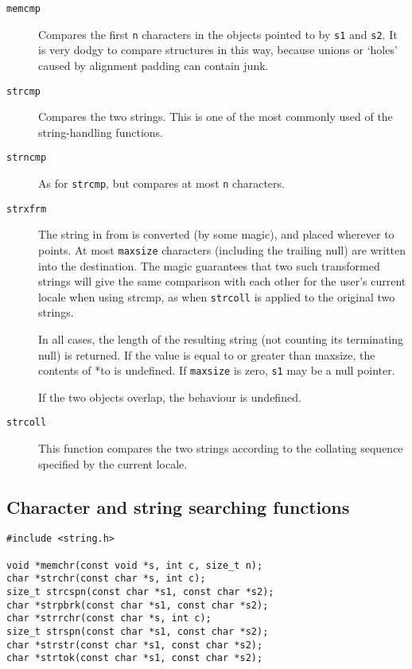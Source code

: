   \begin{description}
   \item[\texttt{memcmp}]
     Compares the first \texttt{n} characters in the objects pointed to
     by  \texttt{s1} and \texttt{s2}.  It is very dodgy to compare
     structures in this way, because unions or `holes' caused  by
     alignment padding can contain junk.

   \item[\texttt{strcmp}]
     Compares the two  strings.   This  is  one  of  the  most commonly used
     of the string-handling functions.

   \item[\texttt{strncmp}]
     As for \texttt{strcmp}, but compares at most \texttt{n}
     characters.

    \item[\texttt{strxfrm}] 
     The string in from is  converted  (by  some  magic),  and placed
      wherever  to  points.  At most \texttt{maxsize} characters (including
      the  trailing  null)  are  written  into  the destination.
      The   magic guarantees  that  two  such transformed strings
      will give the  same comparison with each other
      for the  user's  current  locale when using strcmp,
      as when \texttt{strcoll} is applied to  the  original two strings.


     In all cases, the length of  the  resulting  string  (not counting its
      terminating null) is returned.  If the value is equal to or greater than
      maxsize, the contents of  *to is  undefined.
      If  \texttt{maxsize} is zero, \texttt{s1} may be a null pointer.


     If the two objects overlap, the behaviour is undefined.

   \item[\texttt{strcoll}]
     This function compares the two strings according  to  the
     collating sequence specified by the current locale.
   \end{description}

  

  \subsection{Character and string searching functions}
   

   \begin{Verbatim}
#include <string.h>

void *memchr(const void *s, int c, size_t n);
char *strchr(const char *s, int c);
size_t strcspn(const char *s1, const char *s2);
char *strpbrk(const char *s1, const char *s2);
char *strrchr(const char *s, int c);
size_t strspn(const char *s1, const char *s2);
char *strstr(const char *s1, const char *s2);
char *strtok(const char *s1, const char *s2);
\end{Verbatim}

